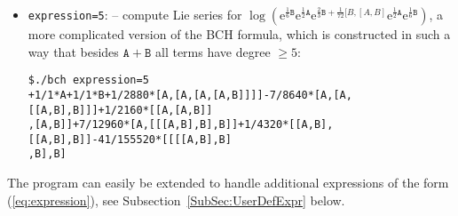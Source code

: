 \documentclass[11pt,a4paper]{article}
\newcommand{\ee}{\mathrm{e}}
\renewcommand{\AA}{\mathtt{A}}
\newcommand{\BB}{\mathtt{B}}
\begin{document}
\begin{itemize}[leftmargin=*]
\item {\tt expression=5}: -- compute Lie series for $\log(\ee^{\frac{1}{6}\BB}\ee^{\frac{1}{2}\AA}
\ee^{\frac{2}{3}\BB+\frac{1}{72}[B,[A,B]}\ee^{\frac{1}{2}\AA}\ee^{\frac{1}{6}\BB})$,
a more complicated version of the BCH formula, which is constructed in such a way that 
besides $\AA+\BB$ all terms have degree $\geq 5$:

{\small\begin{BVerbatim}
$./bch expression=5
+1/1*A+1/1*B+1/2880*[A,[A,[A,[A,B]]]]-7/8640*[A,[A,[[A,B],B]]]+1/2160*[[A,[A,B]]
,[A,B]]+7/12960*[A,[[[A,B],B],B]]+1/4320*[[A,B],[[A,B],B]]-41/155520*[[[[A,B],B]
,B],B]
\end{BVerbatim}
}
\end{itemize}
The program can easily be extended to handle additional expressions
of the form (\ref{eq:expression}), see Subsection~\ref{SubSec:UserDefExpr} below.
\end{document}

